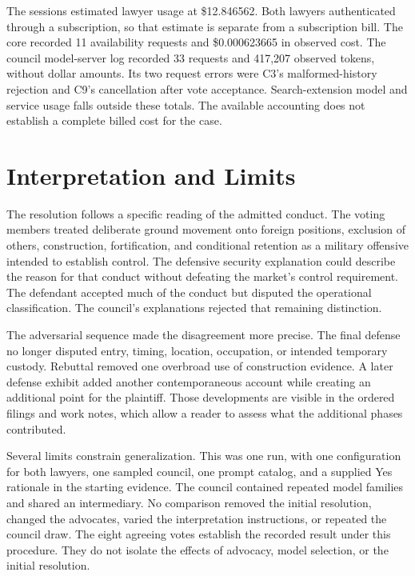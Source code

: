 \documentclass[11pt]{article}
\begin{document}
The sessions estimated lawyer usage at \$12.846562.  Both lawyers authenticated through a subscription, so that estimate is separate from a subscription bill.  The core recorded 11 availability requests and \$0.000623665 in observed cost.  The council model-server log recorded 33 requests and 417,207 observed tokens, without dollar amounts.  Its two request errors were C3's malformed-history rejection and C9's cancellation after vote acceptance.  Search-extension model and service usage falls outside these totals.  The available accounting does not establish a complete billed cost for the case.

\section{Interpretation and Limits}

The resolution follows a specific reading of the admitted conduct.  The voting members treated deliberate ground movement onto foreign positions, exclusion of others, construction, fortification, and conditional retention as a military offensive intended to establish control.  The defensive security explanation could describe the reason for that conduct without defeating the market's control requirement.  The defendant accepted much of the conduct but disputed the operational classification.  The council's explanations rejected that remaining distinction.

The adversarial sequence made the disagreement more precise.  The final defense no longer disputed entry, timing, location, occupation, or intended temporary custody.  Rebuttal removed one overbroad use of construction evidence.  A later defense exhibit added another contemporaneous account while creating an additional point for the plaintiff.  Those developments are visible in the ordered filings and work notes, which allow a reader to assess what the additional phases contributed.

Several limits constrain generalization.  This was one run, with one configuration for both lawyers, one sampled council, one prompt catalog, and a supplied Yes rationale in the starting evidence.  The council contained repeated model families and shared an intermediary.  No comparison removed the initial resolution, changed the advocates, varied the interpretation instructions, or repeated the council draw.  The eight agreeing votes establish the recorded result under this procedure.  They do not isolate the effects of advocacy, model selection, or the initial resolution.
\end{document}

